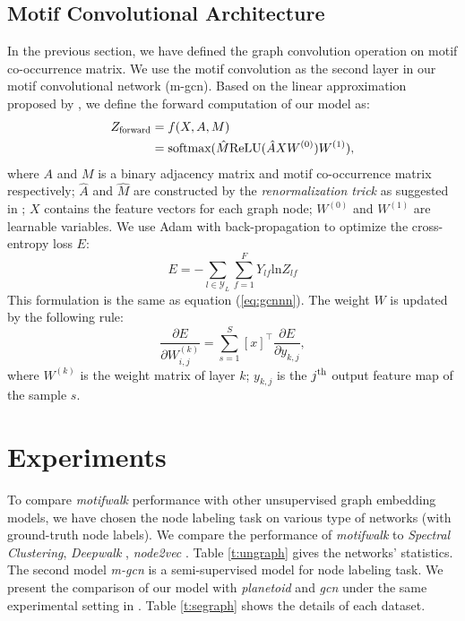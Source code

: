 \documentclass{article}
\theoremstyle{definition}
\begin{document}
\subsection{Motif Convolutional Architecture}

In the previous section, we have defined the graph convolution
operation on motif co-occurrence matrix. We use the motif convolution
as the second layer in our motif convolutional network (m-gcn). Based on the 
linear approximation proposed by \citeauthor{gcn}, we define the forward
computation of our model as:
\begin{equation} 
    \begin{aligned}
    Z_{\scalebox{0.75}{forward}} &= f(X,A,M) \\
    &= \mbox{softmax}(\hat{M} \mbox{ReLU}(\hat{A}XW^{(0)})W^{(1)}),
    \end{aligned}
    \label{eq:mforward}
\end{equation}
where $A$ and $M$ is a binary adjacency matrix and motif co-occurrence
matrix respectively; $\hat{A}$ and $\hat{M}$ are constructed by the
\emph{renormalization trick} as suggested in \cite{gcn}; $X$ contains
the feature vectors for each graph node; $W^{(0)}$ and $W^{(1)}$ are
learnable variables. We use Adam \cite{adam} with back-propagation 
to optimize the cross-entropy loss $E$:
\begin{equation}
	E = -\sum_{l \in \mathcal{Y}_L} \sum^F_{f=1} Y_{lf}\mbox{ln} Z_{lf}
	\label{eq:mloss}
\end{equation}
This formulation is the same as equation (\ref{eq:gcnnn}). The weight $W$ is updated
by the following rule:
\begin{equation}
	\frac{\partial E}{\partial W^{(k)}_{i,j}} = \sum^S_{s=1} [x]^\top \frac{\partial E}{\partial y_{k,j}},
	\label{eq:mback}
\end{equation}
where $W^{(k)}$ is the weight matrix of layer $k$; $y_{k,j}$ is the 
$j^{\scalebox{0.75}{th}}$ output feature map of the sample $s$. 

\section{Experiments}

To compare \emph{motifwalk} performance with other unsupervised graph
embedding models, we have chosen the node labeling task on various
type of networks (with ground-truth node labels). We
compare the performance of \emph{motifwalk} to \emph{Spectral Clustering}, 
\emph{Deepwalk} \cite{deepwalk}, \emph{node2vec} \cite{node2vec}. 
Table \ref{t:ungraph} gives the networks' statistics. The second model 
\emph{m-gcn} is a semi-supervised model for node labeling task. 
We present the comparison of our model with \emph{planetoid} and
\emph{gcn} under the same experimental setting in \cite{gcn}. 
Table \ref{t:segraph} shows the details of each dataset.
\end{document}
